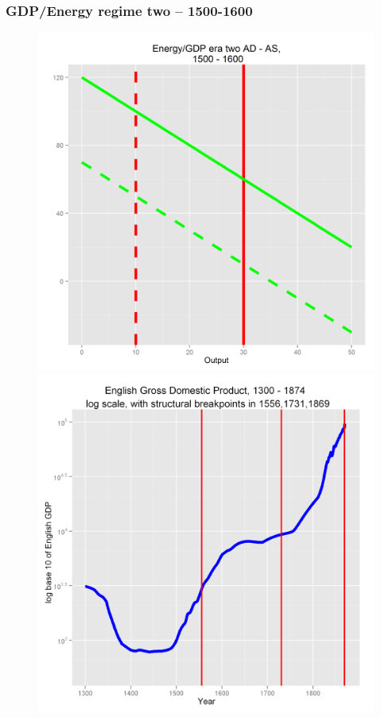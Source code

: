 \documentclass[final]{beamer}
\begin{document}
\begin{frame}
\frametitle{GDP/Energy regime two -- 1500-1600}
		\begin{figure}[p!]
		\label{fig:asad}		
		\centerline{
		\mbox{\includegraphics[height=0.5\textheight]{era2}}
		\mbox{\includegraphics[height=0.5\textheight]{gbpgdplog}}
}
\end{figure}
\end{frame}
\end{document}
